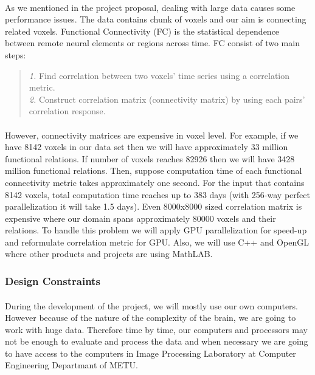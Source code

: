 \documentclass[paper=a4, fontsize=12pt]{scrartcl}	%
\numberwithin{equation}{section}		%
\numberwithin{figure}{section}			%
\numberwithin{table}{section}				%
\begin{document}
    \paragraph{}
    \normalsize
    As we mentioned in the project proposal, dealing with large data causes some performance issues. The data contains chunk of voxels and our aim is connecting related voxels.
    Functional Connectivity (FC) is the statistical dependence between remote neural elements or regions across time. FC consist of two main steps:\\
    \begin{quote}
    \textit{1.} Find correlation between two voxels' time series using a correlation metric.\\
    \textit{2.} Construct correlation matrix (connectivity matrix) by using each pairs' correlation response.\\
    \end{quote}
    \paragraph{}
    However, connectivity matrices are expensive in voxel level. For example, if we have 8142 voxels in our data set then we will have approximately 33 million functional relations. If number of voxels reaches 82926 then we will have 3428 million functional relations. Then, suppose computation time of each functional connectivity metric takes approximately one second. For the input that contains 8142 voxels, total computation time reaches up to 383 days (with 256-way perfect parallelization it will take 1.5 days). Even 8000x8000 sized correlation matrix is expensive where our domain spans approximately 80000 voxels and their relations. To handle this problem we will apply GPU parallelization for speed-up and reformulate correlation metric for GPU. Also, we will use C++ and OpenGL where other products and projects are using MathLAB.\\
    
	\subsubsection{Design Constraints}
    \paragraph{}
    During the development of the project, we will mostly use our own computers. However because of the nature of the complexity of the brain, we are going to work with huge data. Therefore time by time, our computers and processors may not be enough to evaluate and process the data and when necessary we are going to have access to the computers in Image Processing Laboratory at Computer Engineering Departmant of METU.\\
    
\end{document}
